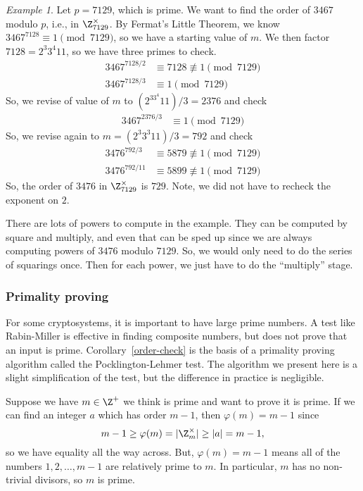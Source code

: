 \documentclass[12pt]{amsart}
\theoremstyle{plain}
\theoremstyle{definition}
\theoremstyle{remark}
\newtheorem*{exam}{Example}
\begin{document}
\begin{exam}
 Let  $p=7129$, which is prime.  We want to find the order of $3467$
 modulo $p$, i.e., in $\Z_{7129}^\times$.  By Fermat's Little Theorem,
 we know $3467^{7128}\equiv 1\pmod{7129}$, so we have a starting value
 of $m$.  We then factor $7128=2^3 3^4 11$, so we have three primes to
 check.
\begin{align*}
  3467^{7128/2}&\equiv 7128\not\equiv 1\pmod{7129} \\
    3467^{7128/3}&\equiv 1\pmod{7129}
\end{align*}
So, we revise of value of $m$ to $(2^33^4 11)/3=2376$ and check
\begin{align*}
    3467^{2376/3}&\equiv 1\pmod{7129}
\end{align*}
So, we revise again to $m=(2^3 3^3 11)/3=792$ and check
\begin{align*}
    3476^{792/3}&\equiv 5879\not\equiv 1\pmod{7129} \\
    3476^{792/11}&\equiv 5899\not\equiv 1\pmod{7129}
\end{align*}
So, the order of $3476$ in $\Z_{7129}^\times$ is $729$.  Note, we did
not have to recheck the exponent on $2$.
\end{exam}
There are lots of powers to compute in the example.  They can be
computed by square and multiply, and even that can be sped up since we
are always computing powers of $3476$ modulo $7129$.  So, we would
only need to do the series of squarings once.  Then for each power, we
just have to do the ``multiply'' stage.

\subsubsection{Primality proving}
For some cryptosystems, it is important to have large prime numbers.
A test like Rabin-Miller is effective in finding composite numbers,
but does not prove that an input is prime.
Corollary~\ref{order-check} is the basis of a primality proving
algorithm called the Pocklington-Lehmer test.  The algorithm we
present here is a slight simplification of the test, but the
difference in practice is negligible.

Suppose we have $m\in\Z^+$ we think is prime and want to prove it is
prime.  If we can find an integer $a$ which has order $m-1$, then
$\varphi(m)=m-1$ since
\[ m-1 \geq \varphi(m)=|\Z_m^\times|\geq |a| = m-1,\]
so we have equality all the way across.  But, $\varphi(m)=m-1$ means
all of the numbers $1,2,\ldots, m-1$ are relatively prime to $m$.  In
particular, $m$ has no non-trivial divisors, so $m$ is prime.
\end{document}

